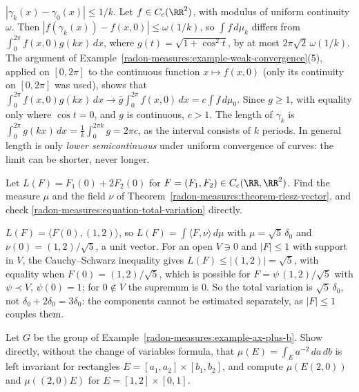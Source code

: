 \begin{solution}
$|\gamma_k(x) - \gamma_0(x)| \leq 1/k$. Let $f \in C_c(\RR^2)$, with modulus of uniform continuity $\omega$. Then $|f(\gamma_k(x)) - f(x, 0)| \leq \omega(1/k)$, so $\int f\,d\mu_k$ differs from
$\int_0^{2\pi}f(x, 0)g(kx)\,dx$, where $g(t) = \sqrt{1 + \cos^2t}$, by at most $2\pi\sqrt2\,\omega(1/k)$. The argument of Example~\ref{radon-measures:example-weak-convergence}(5), applied on $[0, 2\pi]$ to the
continuous function $x \mapsto f(x, 0)$ (only its continuity on $[0, 2\pi]$ was used), shows that $\int_0^{2\pi}f(x, 0)g(kx)\,dx \to \bar g\int_0^{2\pi}f(x, 0)\,dx = c\int f\,d\mu_0$. Since $g \geq 1$, with
equality only where $\cos t = 0$, and $g$ is continuous, $c > 1$. The length of $\gamma_k$ is $\int_0^{2\pi}g(kx)\,dx = \frac1k\int_0^{2\pi k}g = 2\pi c$, as the interval consists of $k$ periods. In
general length is only \emph{lower semicontinuous} under uniform convergence of curves: the limit can be shorter, never longer.
\end{solution}

\begin{exercise}\label{radon-measures:exercise-total-variation-point}
Let $L(F) = F_1(0) + 2F_2(0)$ for $F = (F_1, F_2) \in C_c(\RR, \RR^2)$. Find the measure $\mu$ and the field $\nu$ of Theorem~\ref{radon-measures:theorem-riesz-vector}, and check
\eqref{radon-measures:equation-total-variation} directly.
\end{exercise}

\begin{solution}
$L(F) = \langle F(0), (1, 2)\rangle$, so $L(F) = \int\langle F, \nu\rangle\,d\mu$ with $\mu = \sqrt5\,\delta_0$ and $\nu(0) = (1, 2)/\sqrt5$, a unit vector. For an open $V \ni 0$ and $|F| \leq 1$ with
support in $V$, the Cauchy--Schwarz inequality gives $L(F) \leq |(1, 2)| = \sqrt5$, with equality when $F(0) = (1, 2)/\sqrt5$, which is possible for $F = \psi\,(1, 2)/\sqrt5$ with $\psi \prec V$, $\psi(0) = 1$; for
$0 \notin V$ the supremum is $0$. So the total variation is $\sqrt5\,\delta_0$, not $\delta_0 + 2\delta_0 = 3\delta_0$: the components cannot be estimated separately, as $|F| \leq 1$ couples them.
\end{solution}

\begin{exercise}\label{radon-measures:exercise-haar-affine-line}
Let $G$ be the group of Example~\ref{radon-measures:example-ax-plus-b}. Show directly, without the change of variables formula, that $\mu(E) = \int_Ea^{-2}\,da\,db$ is left invariant for rectangles
$E = [a_1, a_2] \times [b_1, b_2]$, and compute $\mu(E(2, 0))$ and $\mu((2, 0)E)$ for $E = [1, 2] \times [0, 1]$.
\end{exercise}


